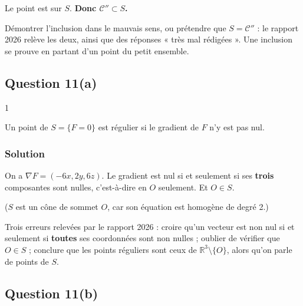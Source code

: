 \documentclass[11pt,a4paper]{article}
\newcommand{\equationajustee}[1]{%
  \sbox{\boiteequation}{$\displaystyle #1$}%
  \ifdim\wd\boiteequation>\linewidth
    \[\resizebox{\linewidth}{!}{\usebox{\boiteequation}}\]%
  \else
    \[#1\]%
  \fi}
\begin{document}
Le point est sur \(S\). \textbf{Donc \(\mathcal{C}''\subset S\).}

\begin{piege}

Démontrer l'inclusion dans le mauvais sens, ou prétendre que \(S=\mathcal{C}''\) : le rapport 2026 relève les deux, ainsi que des réponses « très mal rédigées ». Une inclusion se prouve en partant d'un point du petit ensemble.

\end{piege}

\hypertarget{question-11a}{%
\subsection{Question 11(a)}\label{question-11a}}

\begin{indication}{1}

Un point de \(S=\{F=0\}\) est régulier si le gradient de \(F\) n'y est pas nul.

\end{indication}

\hypertarget{solution-32}{%
\subsubsection{Solution}\label{solution-32}}

On a \(\nabla F=(-6x,2y,6z)\). Le gradient est nul si et seulement si ses \textbf{trois} composantes sont nulles, c'est-à-dire en \(O\) seulement. Et \(O\in S\).

\equationajustee{\boxed{\text{Points \text{réguliers} : } S\setminus\{O\}.}}

(\(S\) est un cône de sommet \(O\), car son équation est homogène de degré 2.)

\begin{piege}

Trois erreurs relevées par le rapport 2026 : croire qu'un vecteur est non nul si et seulement si \textbf{toutes} ses coordonnées sont non nulles ; oublier de vérifier que \(O\in S\) ; conclure que les points réguliers sont ceux de \({\mathbb{R}}^3\setminus\{O\}\), alors qu'on parle de points de \(S\).

\end{piege}

\hypertarget{question-11b}{%
\subsection{Question 11(b)}\label{question-11b}}
\end{document}
